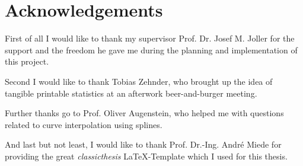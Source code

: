 

\bigskip


\begingroup

\let\clearpage\relax
\let\cleardoublepage\relax
\let\cleardoublepage\relax

\chapter*{Acknowledgements} %

First of all I would like to thank my supervisor Prof. Dr. Josef M. Joller for
the support and the freedom he gave me during the planning and implementation of
this project.

Second I would like to thank Tobias Zehnder, who brought up the idea of tangible
printable statistics at an afterwork beer-and-burger meeting.

Further thanks go to Prof. Oliver Augenstein, who helped me with questions
related to curve interpolation using splines.

And last but not least, I would like to thank Prof. Dr.-Ing. André Miede for
providing the great \emph{classicthesis} \LaTeX-Template which I used for this
thesis.

\endgroup
